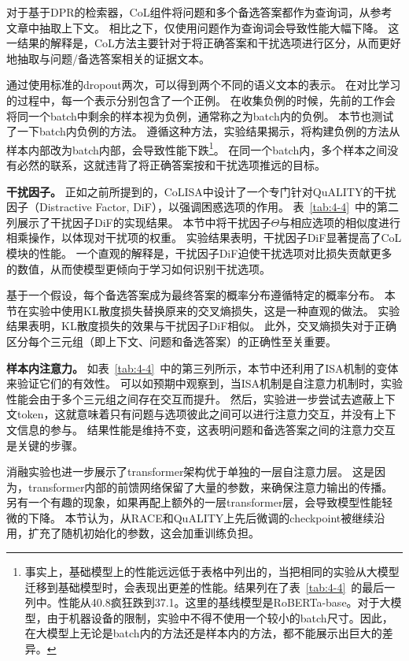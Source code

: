 

对于基于DPR的检索器，CoL组件将问题和多个备选答案都作为查询词，从参考文章中抽取上下文。
相比之下，仅使用问题作为查询词会导致性能大幅下降。
这一结果的解释是，CoL方法主要针对于将正确答案和干扰选项进行区分，从而更好地抽取与问题/备选答案相关的证据文本。

通过使用标准的dropout两次，可以得到两个不同的语义文本的表示。
在对比学习的过程中，每一个表示分别包含了一个正例。
在收集负例的时候，先前的工作会将同一个batch中剩余的样本视为负例，通常称之为batch内的负例\cite{gao2021simcse}。
本节也测试了一下batch内负例的方法。
遵循这种方法，实验结果揭示，将构建负例的方法从样本内部改为batch内部，会导致性能下跌\footnote{事实上，基础模型上的性能远远低于表格中列出的，当把相同的实验从大模型迁移到基础模型时，会表现出更差的性能。结果列在了表~\ref{tab:4-4}~的最后一列中。性能从40.8疯狂跌到37.1。这里的基线模型是RoBERTa-base。对于大模型，由于机器设备的限制，实验中不得不使用一个较小的batch尺寸。因此，在大模型上无论是batch内的方法还是样本内的方法，都不能展示出巨大的差异。}。
在同一个batch内，多个样本之间没有必然的联系，这就违背了将正确答案按和干扰选项推远的目标。

\textbf{干扰因子。}
正如之前所提到的，CoLISA中设计了一个专门针对QuALITY的干扰因子（Distractive Factor, DiF），以强调困惑选项的作用。
表~\ref{tab:4-4}~中的第二列展示了干扰因子DiF的实现结果。
本节中将干扰因子$\Theta$与相应选项的相似度进行相乘操作，以体现对干扰项的权重。
实验结果表明，干扰因子DiF显著提高了CoL模块的性能。
一个直观的解释是，干扰因子DiF迫使干扰选项对比损失贡献更多的数值，从而使模型更倾向于学习如何识别干扰选项。

基于一个假设，每个备选答案成为最终答案的概率分布遵循特定的概率分布。
本节在实验中使用KL散度损失\cite{hershey2007approximating}替换原来的交叉熵损失，这是一种直观的做法。
实验结果表明，KL散度损失的效果与干扰因子DiF相似。
此外，交叉熵损失对于正确区分每个三元组（即上下文、问题和备选答案）的正确性至关重要。

\textbf{样本内注意力。}
如表~\ref{tab:4-4}~中的第三列所示，本节中还利用了ISA机制的变体来验证它们的有效性。
可以如预期中观察到，当ISA机制是自注意力机制时，实验性能会由于多个三元组之间存在交互而提升。
然后，实验进一步尝试去遮蔽上下文token，这就意味着只有问题与选项彼此之间可以进行注意力交互，并没有上下文信息的参与。
结果性能是维持不变，这表明问题和备选答案之间的注意力交互是关键的步骤。

消融实验也进一步展示了transformer架构优于单独的一层自注意力层。
这是因为，transformer内部的前馈网络保留了大量的参数，来确保注意力输出的传播。
另有一个有趣的现象，如果再配上额外的一层transformer层，会导致模型性能轻微的下降。
本节认为，从RACE和QuALITY上先后微调的checkpoint被继续沿用，扩充了随机初始化的参数，这会加重训练负担。

